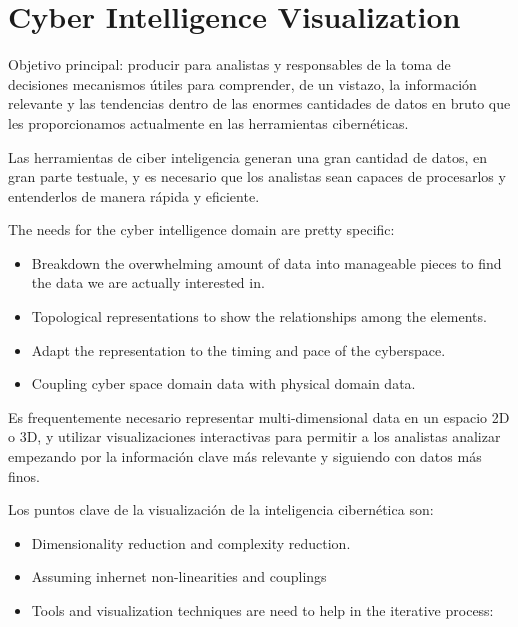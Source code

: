 \chapter{Cyber Intelligence Visualization}

Objetivo principal: producir para analistas y responsables de la toma de decisiones mecanismos útiles para
comprender, de un vistazo, la información relevante y las tendencias dentro de las enormes cantidades
de datos en bruto que les proporcionamos actualmente en las herramientas cibernéticas.

Las herramientas  de ciber inteligencia generan una gran cantidad de datos, en gran parte testuale, y es necesario que los analistas sean capaces de procesarlos y entenderlos de manera rápida y eficiente.

The needs for the cyber intelligence domain are pretty specific:
\begin{itemize}
   \item Breakdown the overwhelming amount of data into manageable pieces to find the data we are actually interested in.
   \item Topological representations to show the relationships among the elements.
   \item Adapt the representation to the timing and pace of the cyberspace.
   \item Coupling cyber space domain data with physical domain data.
\end{itemize}

Es frequentemente necesario representar multi-dimensional data en un espacio 2D o 3D, y utilizar visualizaciones interactivas para permitir a los analistas analizar empezando por la información clave más relevante y siguiendo con datos más finos.

Los puntos clave de la visualización de la inteligencia cibernética son:
\begin{itemize}
   \item Dimensionality reduction and complexity reduction.
   \item Assuming inhernet non-linearities and couplings
   \item Tools and visualization techniques are need to help in the iterative process:
\end{itemize}

